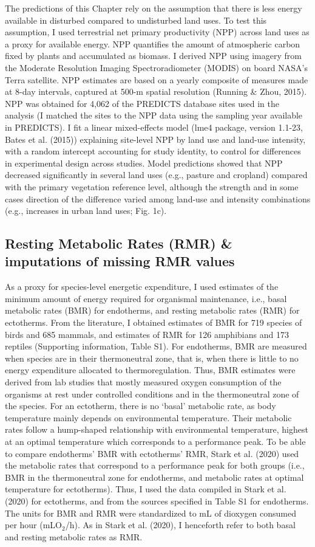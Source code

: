 The predictions of this Chapter rely on the assumption that there is less energy available in disturbed compared to undisturbed land uses. To test this assumption, I used terrestrial net primary productivity (NPP) across land uses as a proxy for available energy. NPP quantifies the amount of atmospheric carbon fixed by plants and accumulated as biomass. I derived NPP using imagery from the Moderate Resolution Imaging Spectroradiometer (MODIS) on board NASA’s Terra satellite. NPP estimates are based on a yearly composite of measures made at 8-day intervals, captured at 500-m spatial resolution (Running \& Zhou, 2015). NPP was obtained for 4,062 of the PREDICTS database sites used in the analysis (I matched the sites to the NPP data using the sampling year available in PREDICTS). I fit a linear mixed-effects model (lme4 package, version 1.1-23, Bates et al. (2015)) explaining site-level NPP by land use and land-use intensity, with a random intercept accounting for study identity, to control for differences in experimental design across studies. Model predictions showed that NPP decreased significantly in several land uses (e.g., pasture and cropland) compared with the primary vegetation reference level, although the strength and in some cases direction of the difference varied among land-use and intensity combinations (e.g., increases in urban land uses; Fig. 1c).

\subsection{Resting Metabolic Rates (RMR) \& imputations of missing RMR values}

As a proxy for species-level energetic expenditure, I used estimates of the minimum amount of energy required for organismal maintenance, i.e., basal metabolic rates (BMR) for endotherms, and resting metabolic rates (RMR) for ectotherms. From the literature, I obtained estimates of BMR for 719 species of birds and 685 mammals, and estimates of RMR for 126 amphibians and 173 reptiles (Supporting information, Table S1). For endotherms, BMR are measured when species are in their thermoneutral zone, that is, when there is little to no energy expenditure allocated to thermoregulation. Thus, BMR estimates were derived from lab studies that mostly measured oxygen consumption of the organisms at rest under controlled conditions and in the thermoneutral zone of the species. For an ectotherm, there is no `basal' metabolic rate, as body temperature mainly depends on environmental temperature. Their metabolic rates follow a hump-shaped relationship with environmental temperature, highest at an optimal temperature which corresponds to a performance peak. To be able to compare endotherms’ BMR with ectotherms’ RMR, Stark et al. (2020) used the metabolic rates that correspond to a performance peak for both groups (i.e., BMR in the thermoneutral zone for endotherms, and metabolic rates at optimal temperature for ectotherms). Thus, I used the data compiled in Stark et al. (2020) for ectotherms, and from the sources specified in Table S1 for endotherms. The units for BMR and RMR were standardized to mL of dioxygen consumed per hour (mLO$_2$/h). As in Stark et al. (2020), I henceforth refer to both basal and resting metabolic rates as RMR. 

